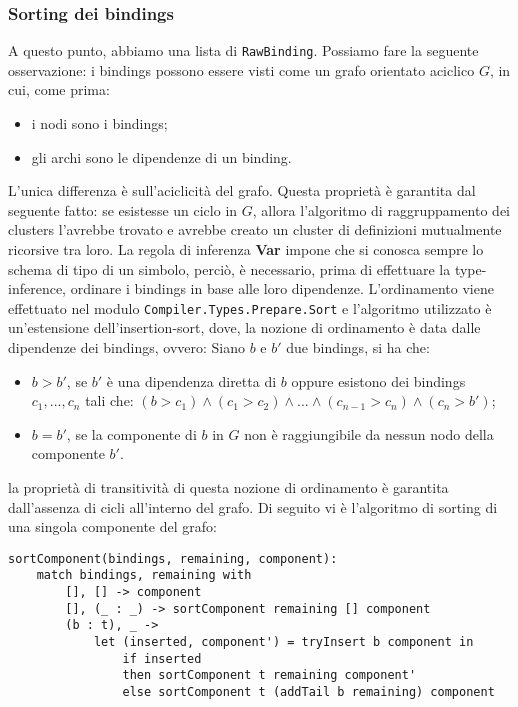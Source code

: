 \documentclass[10pt,a4paper]{article}
\begin{document}
\subsubsection{Sorting dei bindings}
A questo punto, abbiamo una lista di \texttt{RawBinding}. Possiamo fare la seguente osservazione: i bindings possono
essere visti come un grafo orientato aciclico $ G $, in cui, come prima:
\begin{itemize}
    \item i nodi sono i bindings;
    \item gli archi sono le dipendenze di un binding.
\end{itemize}
L'unica differenza è sull'aciclicità del grafo. Questa proprietà è garantita dal seguente fatto: se esistesse un ciclo
in $ G $, allora l'algoritmo di raggruppamento dei clusters l'avrebbe trovato e avrebbe creato un cluster di definizioni
mutualmente ricorsive tra loro. La regola di inferenza \textbf{Var} impone che si conosca sempre lo schema di tipo di
un simbolo, perciò, è necessario, prima di effettuare la type-inference, ordinare i bindings in base alle loro dipendenze.
L'ordinamento viene effettuato nel modulo \texttt{Compiler.Types.Prepare.Sort} e l'algoritmo utilizzato è un'estensione
dell'insertion-sort, dove, la nozione di ordinamento è data dalle dipendenze dei bindings, ovvero: \newline
Siano $ b $ e $ b' $ due bindings, si ha che:
\begin{itemize}
    \item $ b > b' $, se $ b' $ è una dipendenza diretta di $ b $ oppure esistono dei bindings $ c_1, ..., c_n $ tali che:
    \newline $ (b > c_1) \wedge (c_1 > c_2) \wedge ... \wedge (c_{n-1} > c_n) \wedge (c_n > b') $;
    \item $ b = b' $, se la componente di $ b $ in $ G $ non è raggiungibile da nessun nodo della componente $ b' $.
\end{itemize}
la proprietà di transitività di questa nozione di ordinamento è garantita dall'assenza di cicli all'interno del grafo.
Di seguito vi è l'algoritmo di sorting di una singola componente del grafo:
\begin{lstlisting}
sortComponent(bindings, remaining, component):
    match bindings, remaining with
        [], [] -> component
        [], (_ : _) -> sortComponent remaining [] component
        (b : t), _ ->
            let (inserted, component') = tryInsert b component in
                if inserted
                then sortComponent t remaining component'
                else sortComponent t (addTail b remaining) component 
\end{lstlisting}
\end{document}
